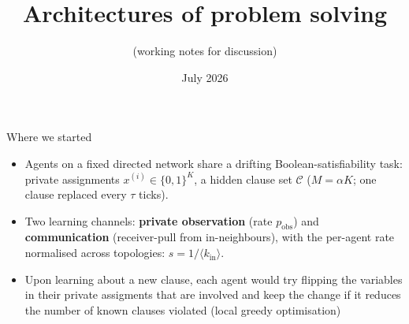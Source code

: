 \documentclass[aspectratio=169,11pt]{beamer}
\title{Architectures of problem solving}
\subtitle{\small (working notes for discussion)}
\author{}
\date{July 2026}
\begin{document}
\begin{frame}
  \titlepage
\end{frame}

\begin{frame}{Where we started}
 
  \begin{itemize}
    \item Agents on a fixed directed network share a drifting Boolean-satisfiability task:
          private assignments $x^{(i)} \in \{0,1\}^K$, a hidden clause set $\mathcal{C}$
          ($M=\alpha K$; one clause replaced every $\tau$ ticks).
    \item Two learning channels: \textbf{private observation} (rate $p_{\text{obs}}$) and
          \textbf{communication} (receiver-pull from in-neighbours), with the per-agent rate
          normalised across topologies: $s = 1/\langle k_{\text{in}}\rangle$.
   \item Upon learning about a new clause, each agent would try flipping the variables in their private assigments that are involved and keep the change if it reduces the number of known clauses violated (local greedy optimisation)
  \end{itemize}
  \vspace{4pt}
\end{frame}
\end{document}
